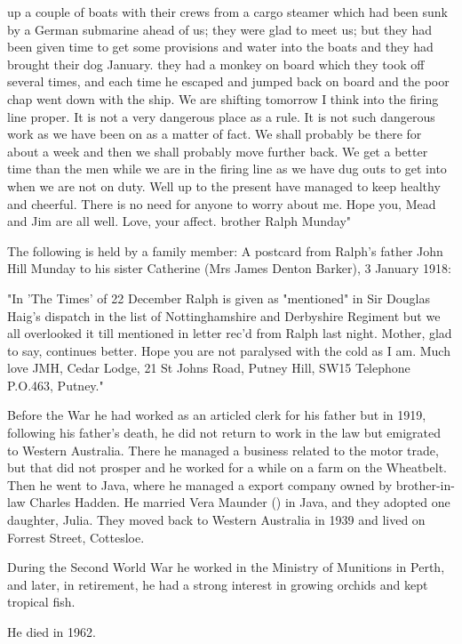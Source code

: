 up a couple of boats with their crews from a cargo steamer which had been sunk by a German submarine ahead of us; they were glad to meet us; but they had been given time to get some provisions and water into the boats and they had brought their dog January. they had a monkey on board which they took off several times, and each time he escaped and jumped back on board and the poor chap went down with the ship.
    We are shifting tomorrow I think into the firing line proper. It is not a very dangerous place as a rule. It is not such dangerous work as we have been on as a matter of fact. We shall probably be there for about a week and then we shall probably move further back. We get a better time than the men while we are in the firing line as we have dug outs to get into when we are not on duty.
    Well up to the present have managed to keep healthy and cheerful. There is no need for anyone to worry about me.
    Hope you, Mead and Jim are all well.
    Love, your affect. brother
    Ralph Munday" 

The following is held by a family member: A postcard from Ralph's father John Hill Munday to his sister Catherine (Mrs James Denton Barker), 3 January 1918:

    "In 'The Times' of 22 December Ralph is given as "mentioned" in Sir Douglas Haig's dispatch in the list of Nottinghamshire and Derbyshire Regiment but we all overlooked it till mentioned in letter rec'd from Ralph last night.
    Mother, glad to say, continues better.
    Hope you are not paralysed with the cold as I am.
    Much love JMH, Cedar Lodge, 21 St Johns Road, Putney Hill, SW15
    Telephone P.O.463, Putney."

Before the War he had worked as an articled clerk for his father but in 1919, following his father's death, he did not return to work in the law but emigrated to Western Australia.  There he managed a business related to the motor trade, but that did not prosper and he worked for a while on a farm on the Wheatbelt. Then he went to Java,  where he managed a export company owned by brother-in-law Charles Hadden.  He married Vera Maunder () in Java,\cite{LadiesSection} and they adopted one daughter, Julia.
They  moved back to Western Australia in 1939 and lived on Forrest Street, Cottesloe. 

During the Second World War he worked in the Ministry of Munitions in Perth, and later, in retirement, he had a strong interest in growing orchids and kept tropical fish. 

He died in 1962.\cite{RalphMundayBMD}




  
